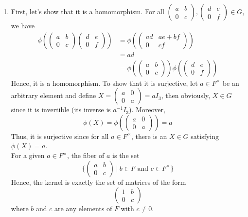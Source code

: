 \begin{solution}
    \begin{enumerate}[label = \textbf{(\alph*)}]
        \item First, let's show that it is a homomorphism. For all $\begin{pmatrix} a & b \\ 0 & c \end{pmatrix}, \begin{pmatrix} d & e \\ 0 & f \end{pmatrix} \in G$, we have
        \begin{align*}
            \phi\left(\begin{pmatrix} a & b \\ 0 & c \end{pmatrix} \begin{pmatrix} d & e \\ 0 & f \end{pmatrix}\right) &= \phi\left(\begin{pmatrix} ad & ae + bf \\ 0 & cf \end{pmatrix}\right) \\
            &= ad \\
            &= \phi\left(\begin{pmatrix} a & b \\ 0 & c \end{pmatrix}\right)\phi\left(\begin{pmatrix} d & e \\ 0 & f \end{pmatrix}\right)
        \end{align*}
        Hence, it is a homomorphism. To show that it is surjective, let $a \in F^{\times}$ be an arbitrary element and define $X = \begin{pmatrix} a & 0 \\ 0 & a \end{pmatrix} = aI_3$, then obviously, $X \in G$ since it is invertible (its inverse is $a^{-1}I_3$). Moreover, 
        $$\phi(X) = \phi\left(\begin{pmatrix} a & 0 \\ 0 & a \end{pmatrix}\right) = a$$
        Thus, it is surjective since for all $a \in F^{\times}$, there is an $X \in G$ satisfying $\phi(X) = a$.\\
        For a given $a \in F^{\times}$, the fiber of $a$ is the set 
        $$\{\begin{pmatrix} a & b \\ 0 & c \end{pmatrix} \ | \ b \in F \text{ and } c \in F^{\times}\}$$
        Hence, the kernel is exactly the set of matrices of the form 
        $$\begin{pmatrix} 1 & b \\ 0 & c \end{pmatrix}$$
        where $b$ and $c$ are any elements of $F$ with $c\neq 0$.
        

\end{enumerate}
\end{solution}

